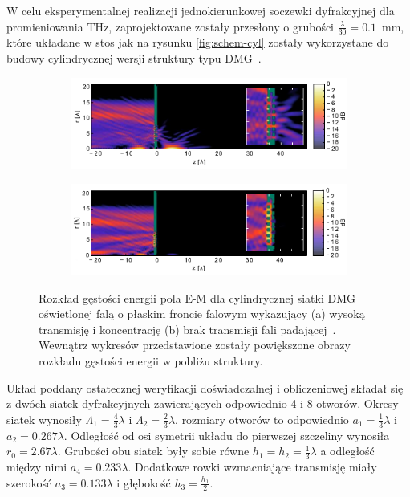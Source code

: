 W celu eksperymentalnej realizacji jednokierunkowej soczewki dyfrakcyjnej dla promieniowania THz, zaprojektowane zostały przesłony o grubości $\frac{\lambda}{30}=0.1$~mm, które układane w stos jak na rysunku \ref{fig:schem-cyl} zostały wykorzystane do budowy cylindrycznej wersji struktury typu DMG~\cite{Yavorskiy:14}. 
\begin{figure}[tb]
	\begin{subfigure}{\textwidth}
		\includegraphics[width=\textwidth]{images/dmg/express-high-kontrast-trans.png}
		\caption{}
	\end{subfigure}

	\begin{subfigure}{\textwidth}
		\includegraphics[width=\textwidth]{images/dmg/express-high-kontrast-block.png}
		\caption{}
	\end{subfigure}
	\caption{Rozkład gęstości energii pola E-M dla cylindrycznej siatki DMG oświetlonej falą o płaskim froncie falowym wykazujący (a) wysoką transmisję i koncentrację (b) brak transmisji fali padającej~\cite{Yavorskiy:14}. Wewnątrz wykresów przedstawione zostały powiększone obrazy rozkładu gęstości energii w pobliżu struktury.}
	\label{fig:cyl-gest-ene}
\end{figure}

Układ poddany ostatecznej weryfikacji doświadczalnej i obliczeniowej składał się z dwóch siatek dyfrakcyjnych zawierających odpowiednio 4 i 8 otworów. Okresy siatek wynosiły $\Lambda_1=\frac{4}{3} \lambda$ i $\Lambda_2=\frac{2}{3} \lambda$, rozmiary otworów to odpowiednio $a_1=\frac{1}{3}\lambda$ i $a_2=0.267 \lambda$. Odległość od osi symetrii układu do pierwszej szczeliny wynosiła $r_0=2.67\lambda$. Grubości obu siatek były sobie równe $h_1=h_2=\frac{1}{3}\lambda$ a odległość między nimi $a_4=0.233\lambda$. Dodatkowe rowki wzmacniające transmisję miały szerokość $a_3=0.133\lambda$ i głębokość $h_3=\frac{h_1}{2}$. 

